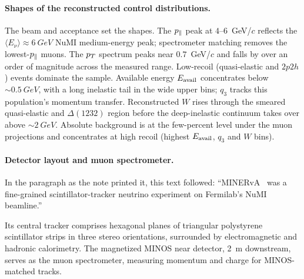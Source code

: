 \paragraph{Shapes of the reconstructed control distributions.} The beam and acceptance set the shapes. The $p_{\parallel}$ peak at $4$--$6$~GeV/$c$ reflects the ${\langle E_\nu\rangle}\approx\SI{6}{GeV}$ NuMI medium-energy peak; spectrometer matching removes the lowest-$p_{\parallel}$ muons. The $p_{T}$ spectrum peaks near $0.7$~GeV/$c$ and falls by over an order of magnitude across the measured range. Low-recoil (quasi-elastic and $2p2h$) events dominate the sample. Available energy $E_{\mathrm{avail}}$ concentrates below ${\sim}\SI{0.5}{GeV}$, with a long inelastic tail in the wide upper bins; $q_{3}$ tracks this population's momentum transfer. Reconstructed $W$ rises through the smeared quasi-elastic and $\Delta(1232)$ region before the deep-inelastic continuum takes over above ${\sim}\SI{2}{GeV}$. Absolute background is at the few-percent level under the muon projections and concentrates at high recoil (highest $E_{\mathrm{avail}}$, $q_{3}$ and $W$ bins).

\paragraph{Detector layout and muon spectrometer.} In the paragraph as the note printed it, this text followed: ``MINERvA~\cite{MINERvA:2013zvz} was a fine-grained scintillator-tracker neutrino experiment on Fermilab's NuMI beamline.''\par Its central tracker comprises hexagonal planes of triangular polystyrene scintillator strips in three stereo orientations, surrounded by electromagnetic and hadronic calorimetry. The magnetized MINOS near detector, \SI{2}{m} downstream, serves as the muon spectrometer, measuring momentum and charge for MINOS-matched tracks.

